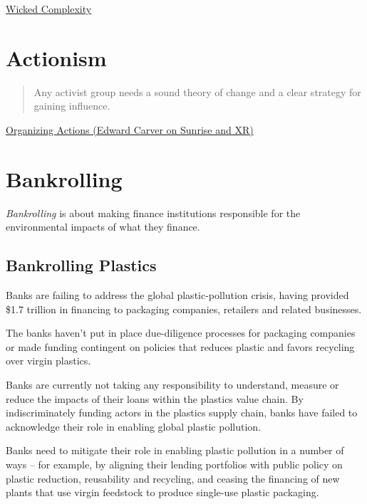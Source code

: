 \documentclass[
]{book}
\begin{document}
\href{https://mahb.stanford.edu/blog/thresholds-cascades-and-wicked-problems/}{Wicked Complexity}

\hypertarget{actionism}{%
\section{Actionism}\label{actionism}}

\begin{quote}
Any activist group needs a sound theory of change and a clear strategy for gaining influence.
\end{quote}

\href{https://jacobinmag.com/2020/12/climate-change-protest-strategy-electoral-politics-sunrise-extinction-rebellion}{Organizing Actions (Edward Carver on Sunrise and XR)}

\hypertarget{bankrolling}{%
\section{Bankrolling}\label{bankrolling}}

\emph{Bankrolling} is about making finance institutions responsible for the environmental
impacts of what they finance.

\hypertarget{bankrolling-plastics}{%
\subsection{Bankrolling Plastics}\label{bankrolling-plastics}}

Banks are failing to address the global plastic-pollution crisis,
having provided \$1.7 trillion in financing to packaging companies, retailers and
related businesses.

The banks haven't put in place due-diligence processes for packaging companies or
made funding contingent on policies that reduces plastic and favors recycling
over virgin plastics.

Banks are currently not taking any responsibility to understand, measure or reduce
the impacts of their loans within the plastics value chain.
By indiscriminately funding actors in the plastics supply chain, banks have failed
to acknowledge their role in enabling global plastic pollution.

Banks need to mitigate their role in enabling plastic pollution in a number of ways
-- for example, by aligning their lending portfolios with public policy
on plastic reduction, reusability and recycling,
and ceasing the financing of new plants that use virgin feedstock
to produce single-use plastic packaging.
\end{document}
